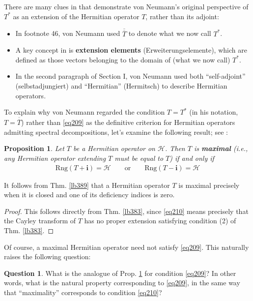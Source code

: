 \documentclass[12pt,b5paper,notitlepage]{article}
\theoremstyle{definition}
\newtheorem{question}[df]{Question}
\theoremstyle{plain}
\newtheorem{pp}[df]{Proposition}
\newcommand{\ovl}{\overline}
\newcommand{\im}{\mathbf{i}}
\newcommand{\Rng}{\mathrm{Rng}}
\newcommand{\MH}{\mathcal H}
\numberwithin{equation}{section}
\begin{document}
There are many clues in \cite{vN29a} that demonstrate von Neumann's original perspective of $T^*$ as an extension of the Hermitian operator $T$, rather than its adjoint:
\begin{itemize}
\item In footnote 46, von Neumann used $\ovl{\ovl T}$ to denote what we now call $T^*$.
\item A key concept in \cite{vN29a} is \textbf{extension elements} (Erweiterungselemente), which are defined as those vectors belonging to the domain of (what we now call) $T^*$.
\item In the second paragraph of Section I, von Neumann used both ``self-adjoint'' (selbstadjungiert) and ``Hermitian'' (Hermitsch) to describe Hermitian operators.
\end{itemize}


To explain why von Neumann regarded the condition $T=T^*$ (in his notation, $T=\ovl{\ovl T}$) rather than \eqref{eq209} as the definitive criterion for Hermitian operators admitting spectral decompositions, let's examine the following result; see \cite[Satz 33]{vN29a}:

\begin{pp}\label{lb410}
Let $T$ be a Hermitian operator on $\MH$. Then $T$ is \textbf{maximal}  (i.e., any Hermitian operator extending $T$ must be equal to $T$) if and only if
\begin{align}\label{eq210}
\Rng(T+\im)=\MH\qquad\text{or}\qquad\Rng(T-\im)=\MH
\end{align}
\end{pp}

It follows from Thm. \ref{lb389} that a Hermitian operator $T$ is maximal precisely when it is closed and one of its deficiency indices is zero.

\begin{proof}
This follows directly from Thm. \ref{lb383}, since \eqref{eq210} means precisely that the Cayley transform of $T$ has no proper extension satisfying condition (2) of Thm. \ref{lb383}.
\end{proof}


Of course, a maximal Hermitian operator need not satisfy \eqref{eq209}. This naturally raises the following question:

\begin{question}
What is the analogue of Prop. \ref{lb410} for condition \eqref{eq209}? In other words, what is the natural property corresponding to \eqref{eq209}, in the same way that ``maximality'' corresponds to condition \eqref{eq210}?
\end{question}
\end{document}
